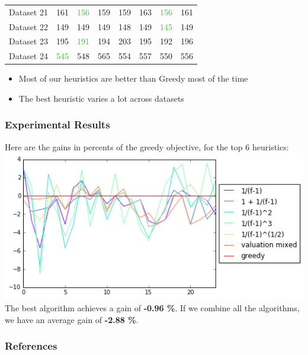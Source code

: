 \documentclass[xcolor=dvipsnames]{beamer}
\begin{document}
\begin{frame}
{\begin{tabular}{*{8}{l}}
 Dataset 21& \textcolor{ProcessBlue}{161}  & \textcolor{LimeGreen}{156}  & \textcolor{ProcessBlue}{159}  & \textcolor{ProcessBlue}{159} &  163  & \textcolor{LimeGreen}{156}  & 161 \\
 Dataset 22& \textcolor{ProcessBlue}{149}  & \textcolor{ProcessBlue}{149} &  \textcolor{ProcessBlue}{149}  & \textcolor{ProcessBlue}{148}  & \textcolor{ProcessBlue}{149}  & \textcolor{LimeGreen}{145} &  149 \\
 Dataset 23& \textcolor{ProcessBlue}{195} &  \textcolor{LimeGreen}{191}  & \textcolor{ProcessBlue}{194} &  203 &  \textcolor{ProcessBlue}{195} &  \textcolor{ProcessBlue}{192} &  196 \\
 Dataset 24 & \textcolor{LimeGreen}{545}  &  \textcolor{ProcessBlue}{548} &  565  & \textcolor{ProcessBlue}{554} &  557  & \textcolor{ProcessBlue}{550}  & 556 \\
     \hline
  \end{tabular}} 
   \begin{itemize}
\item<2-> Most of our heuristics are better than Greedy most of the time
\item<3-> The best heuristic varies a lot across datasets
\end{itemize}

\end{frame}


\begin{frame}
\frametitle{Experimental Results}
Here are the gains in percents of the greedy objective, for the top 6 heuristics:
\includegraphics[width=\textwidth]{../results/heuristics_best6} \\
The best algorithm achieves a gain of \textbf{-0.96 \%}. If we combine all the algorithms, we have an average gain of \textbf{-2.88 \%}.

\end{frame}

\begin{frame}
\frametitle{References}
\end{frame}
\end{document}
